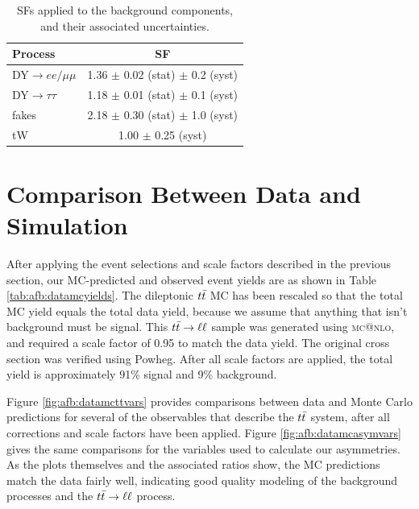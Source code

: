 \begin{table}[h]
\begin{center}
\caption{SFs applied to the background components, and their
  associated uncertainties.}
\label{tab:afb:sfs}
{\small
\begin{tabular}{l|c}
\hline
Process & SF  \\
\hline
DY$\rightarrow ee/\mu\mu$ & 1.36 $\pm$ 0.02 (stat) $\pm$ 0.2 (syst) \\
DY$\rightarrow\tau\tau$   & 1.18 $\pm$ 0.01 (stat) $\pm$ 0.1 (syst) \\
fakes             & 2.18 $\pm$ 0.30 (stat) $\pm$ 1.0 (syst) \\
tW                & 1.00 $\pm$ 0.25 (syst) \\
\hline
\end{tabular}
}
\end{center}
\end{table}

\section{Comparison Between Data and Simulation}
\label{sec:afb:datamccompare}

After applying the event selections and scale factors described in the
previous section, our MC-predicted and observed event yields are as
shown in Table \ref{tab:afb:datamcyields}. The dileptonic $t\bar{t}$
MC has been rescaled so that the total MC yield equals the total data
yield, because we assume that anything that isn't background must be
signal. This $t\bar{t} \rightarrow \ell\ell$ sample was generated using \textsc{mc@nlo}, and
required a scale factor of 0.95 to match the data yield. The original
cross section was verified using Powheg. After all scale factors are applied, the
total yield is approximately 91\% signal and 9\% background.

Figure \ref{fig:afb:datamcttvars} provides comparisons between data
and Monte Carlo predictions for several of the observables
that describe the $t\bar{t}$ system, after all corrections and scale
factors have been applied. Figure \ref{fig:afb:datamcasymvars} gives
the same comparisons for the variables used to calculate our asymmetries.
As the plots themselves and the associated
ratios show, the MC predictions match the data fairly well, indicating
good quality modeling of the background processes and the
$t\bar{t} \rightarrow \ell\ell$ process.

